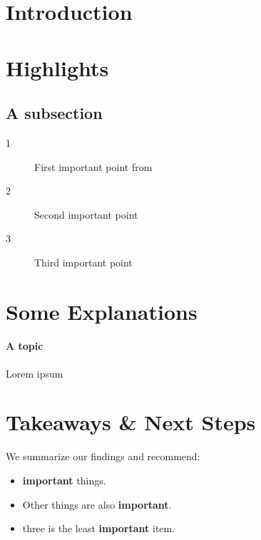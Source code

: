 \documentclass[letterpaper,10pt]{texMemo}
\begin{document}
\maketitle
\section{Introduction}

\section{Highlights}
\subsection{A subsection} 
\begin{description}
	\item[1] First important point from \cite{meade2012identifying}
	\item[2] Second important point
	\item[3] Third important point 
\end{description}
	
\section{Some Explanations}
	\paragraph{A topic} Lorem ipsum	
	
\section{Takeaways \& Next Steps}
We summarize our findings and recommend:
			\begin{itemize}
				\item \textbf{important} things.
				\item Other things are also \textbf{important}.
				\item three is the least \textbf{important} item.
\end{itemize}


\printbibliography
\end{document}
